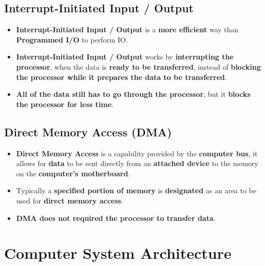 \documentclass[16pt]{article}
\begin{document}
    \subsection*{Interrupt-Initiated Input / Output}
    \begin{itemize}
        \item \textbf{Interrupt-Initiated Input / Output} is a \textbf{more efficient} way than \textbf{Programmed I/O} to perform IO.
        \item \textbf{Interrupt-Initiated Input / Output} works by \textbf{interrupting the processor}, when the data is \textbf{ready to be transferred}, instead of \textbf{blocking the processor while it prepares the data to be transferred}.
        \item \textbf{All of the data still has to go through the processor}, but it \textbf{blocks the processor for less time}.
    \end{itemize}

    \subsection*{Direct Memory Access (DMA)}
    \begin{itemize}
        \item \textbf{Direct Memory Access} is a capability provided by the \textbf{computer bus}, it allows for \textbf{data} to be sent directly from an \textbf{attached device} to the memory on the \textbf{computer's motherboard}.
        \item Typically a \textbf{specified portion of memory} is \textbf{designated} as an area to be used for \textbf{direct memory access}.
        \item \textbf{DMA does not required the processor to transfer data}.
    \end{itemize}

    \section*{Computer System Architecture}
    
\end{document}
